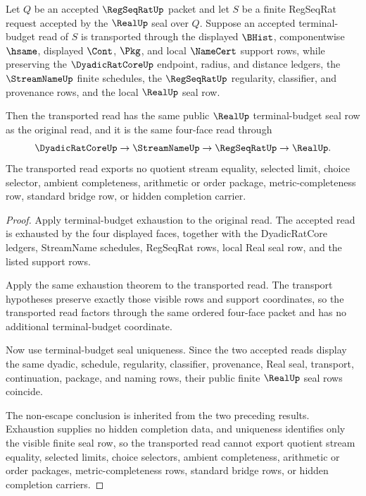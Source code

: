 \begin{theorem}
\label{thm:real-regseqrat-terminal-budget-four-face-naturality}
Let $Q$ be an accepted $\RegSeqRatUp$ packet and let $S$ be a finite RegSeqRat request accepted by the $\RealUp$ seal over $Q$. Suppose an accepted terminal-budget read of $S$ is transported through the displayed $\BHist$, componentwise $\hsame$, displayed $\Cont$, $\Pkg$, and local $\NameCert$ support rows, while preserving the $\DyadicRatCoreUp$ endpoint, radius, and distance ledgers, the $\StreamNameUp$ finite schedules, the $\RegSeqRatUp$ regularity, classifier, and provenance rows, and the local $\RealUp$ seal row.

Then the transported read has the same public $\RealUp$ terminal-budget seal row as the original read, and it is the same four-face read through
$$
\DyadicRatCoreUp \to \StreamNameUp \to \RegSeqRatUp \to \RealUp .
$$
The transported read exports no quotient stream equality, selected limit, choice selector, ambient completeness, arithmetic or order package, metric-completeness row, standard bridge row, or hidden completion carrier.
\end{theorem}
\begin{proof}
Apply terminal-budget exhaustion to the original read. The accepted read is exhausted by the four displayed faces, together with the DyadicRatCore ledgers, StreamName schedules, RegSeqRat rows, local Real seal row, and the listed support rows.

Apply the same exhaustion theorem to the transported read. The transport hypotheses preserve exactly those visible rows and support coordinates, so the transported read factors through the same ordered four-face packet and has no additional terminal-budget coordinate.

Now use terminal-budget seal uniqueness. Since the two accepted reads display the same dyadic, schedule, regularity, classifier, provenance, Real seal, transport, continuation, package, and naming rows, their public finite $\RealUp$ seal rows coincide.

The non-escape conclusion is inherited from the two preceding results. Exhaustion supplies no hidden completion data, and uniqueness identifies only the visible finite seal row, so the transported read cannot export quotient stream equality, selected limits, choice selectors, ambient completeness, arithmetic or order packages, metric-completeness rows, standard bridge rows, or hidden completion carriers.
\end{proof}

